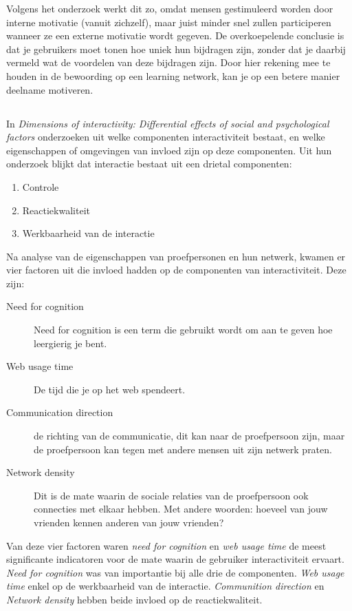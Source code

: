 \documentclass[a4paper, 10pt, pdftex]{report}
\begin{document}
      Volgens het onderzoek werkt dit zo, omdat mensen gestimuleerd worden door interne motivatie (vanuit zichzelf), maar juist minder snel zullen participeren wanneer ze een externe motivatie wordt gegeven. De overkoepelende conclusie is dat je gebruikers moet tonen hoe uniek hun bijdragen zijn, zonder dat je daarbij vermeld wat de voordelen van deze bijdragen zijn. Door hier rekening mee te houden in de bewoording op een learning network, kan je op een betere manier deelname motiveren.

     \subsection{\cite{Sohn2005}}

      In \emph{Dimensions of interactivity: Differential effects of social and psychological factors} onderzoeken \citeauthor{Sohn2005} uit welke componenten interactiviteit bestaat, en welke eigenschappen of omgevingen van invloed zijn op deze componenten. Uit hun onderzoek blijkt dat interactie bestaat uit een drietal componenten:
        \begin{enumerate}
          \item Controle
          \item Reactiekwaliteit
          \item Werkbaarheid van de interactie
        \end{enumerate}
      Na analyse van de eigenschappen van proefpersonen en hun netwerk, kwamen er vier factoren uit die invloed hadden op de componenten van interactiviteit. Deze zijn:
        \begin{description}
          \item[Need for cognition]
            Need for cognition is een term die gebruikt wordt om aan te geven hoe leergierig je bent.
          \item[Web usage time]
            De tijd die je op het web spendeert.
          \item[Communication direction]
            de richting van de communicatie, dit kan naar de proefpersoon zijn, maar de proefpersoon kan tegen met andere mensen uit zijn netwerk praten.
          \item[Network density]
            Dit is de mate waarin de sociale relaties van de proefpersoon ook connecties met elkaar hebben. Met andere woorden: hoeveel van jouw vrienden kennen anderen van jouw vrienden?
        \end{description}
        Van deze vier factoren waren \emph{need for cognition} en \emph{web usage time} de meest significante indicatoren voor de mate waarin de gebruiker interactiviteit ervaart. \emph{Need for cognition} was van importantie bij alle drie de componenten. \emph{Web usage time} enkel op de werkbaarheid van de interactie. \emph{Communition direction} en \emph{Network density} hebben beide invloed op de reactiekwaliteit.
\end{document}
